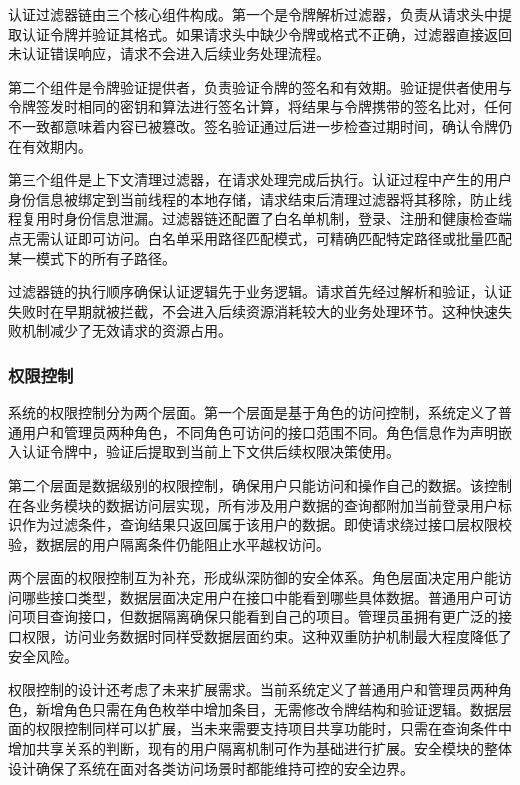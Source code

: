\par 认证过滤器链由三个核心组件构成。第一个是令牌解析过滤器，负责从请求头中提取认证令牌并验证其格式。如果请求头中缺少令牌或格式不正确，过滤器直接返回未认证错误响应，请求不会进入后续业务处理流程。

\par 第二个组件是令牌验证提供者，负责验证令牌的签名和有效期。验证提供者使用与令牌签发时相同的密钥和算法进行签名计算，将结果与令牌携带的签名比对，任何不一致都意味着内容已被篡改。签名验证通过后进一步检查过期时间，确认令牌仍在有效期内。

\par 第三个组件是上下文清理过滤器，在请求处理完成后执行。认证过程中产生的用户身份信息被绑定到当前线程的本地存储，请求结束后清理过滤器将其移除，防止线程复用时身份信息泄漏。过滤器链还配置了白名单机制，登录、注册和健康检查端点无需认证即可访问。白名单采用路径匹配模式，可精确匹配特定路径或批量匹配某一模式下的所有子路径。

\par 过滤器链的执行顺序确保认证逻辑先于业务逻辑。请求首先经过解析和验证，认证失败时在早期就被拦截，不会进入后续资源消耗较大的业务处理环节。这种快速失败机制减少了无效请求的资源占用。

\subsubsection{权限控制}

\par 系统的权限控制分为两个层面。第一个层面是基于角色的访问控制，系统定义了普通用户和管理员两种角色，不同角色可访问的接口范围不同。角色信息作为声明嵌入认证令牌中，验证后提取到当前上下文供后续权限决策使用。

\par 第二个层面是数据级别的权限控制，确保用户只能访问和操作自己的数据。该控制在各业务模块的数据访问层实现，所有涉及用户数据的查询都附加当前登录用户标识作为过滤条件，查询结果只返回属于该用户的数据。即使请求绕过接口层权限校验，数据层的用户隔离条件仍能阻止水平越权访问。

\par 两个层面的权限控制互为补充，形成纵深防御的安全体系。角色层面决定用户能访问哪些接口类型，数据层面决定用户在接口中能看到哪些具体数据。普通用户可访问项目查询接口，但数据隔离确保只能看到自己的项目。管理员虽拥有更广泛的接口权限，访问业务数据时同样受数据层面约束。这种双重防护机制最大程度降低了安全风险。

\par 权限控制的设计还考虑了未来扩展需求。当前系统定义了普通用户和管理员两种角色，新增角色只需在角色枚举中增加条目，无需修改令牌结构和验证逻辑。数据层面的权限控制同样可以扩展，当未来需要支持项目共享功能时，只需在查询条件中增加共享关系的判断，现有的用户隔离机制可作为基础进行扩展。安全模块的整体设计确保了系统在面对各类访问场景时都能维持可控的安全边界。

